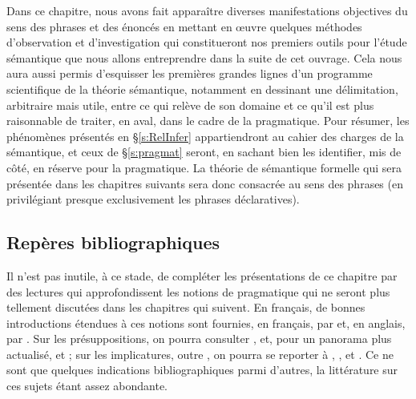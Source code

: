 \begin{refsegment}
Dans ce chapitre, nous avons fait apparaître diverses manifestations objectives du sens des phrases et des énoncés en mettant en \oe uvre quelques méthodes d'observation et d'investigation qui constitueront nos premiers outils pour l'étude sémantique que nous allons entreprendre dans la suite de cet ouvrage. 
Cela nous aura aussi permis  d'esquisser les premières grandes lignes d'un programme scientifique de la théorie sémantique, notamment en dessinant une délimitation, arbitraire mais utile, entre ce qui relève de son domaine et ce qu'il est plus raisonnable de traiter, en aval, dans le cadre de la pragmatique.  
Pour résumer, les phénomènes présentés en \S\ref{s:RelInfer} appartiendront au cahier des charges de la sémantique, et ceux de \S\ref{s:pragmat} seront, en sachant bien les identifier, mis de côté, en réserve pour la pragmatique. 
La théorie de sémantique formelle qui sera présentée dans les chapitres suivants sera donc consacrée au sens des phrases (en privilégiant presque exclusivement les phrases déclaratives).








\nocite{Simons:12x,MoeReb:94,Beav:96,BeavGeurts:12x,Horn:04,DavisGillon:04}

\subsection*{Repères bibliographiques}
Il n'est pas inutile, à ce stade, de compléter les présentations de ce chapitre par des lectures qui approfondissent les notions de pragmatique qui ne seront plus tellement discutées dans les chapitres qui suivent.  En français,  de bonnes introductions étendues à ces notions sont fournies, en français, par \citet{MoeReb:94} et, en anglais, par \citet{Levinson:83}. Sur les présuppositions, on pourra consulter \citet{Ducrot:72,Ducrot:84}, \citet[chap.~4]{Levinson:83} et, pour un panorama plus actualisé,  \citet{Beav:96} et \citet{BeavGeurts:12x} ; sur les implicatures, outre \citet{Grc:75}, on pourra se reporter à \citet[chap.~3]{Levinson:83}, \citet{Horn:04}, \citet[intro \& chap.~1]{Spector:06} et \citet{Simons:12x}. Ce ne sont que quelques indications bibliographiques parmi d'autres, la littérature sur ces sujets étant assez abondante. 


\end{refsegment}
